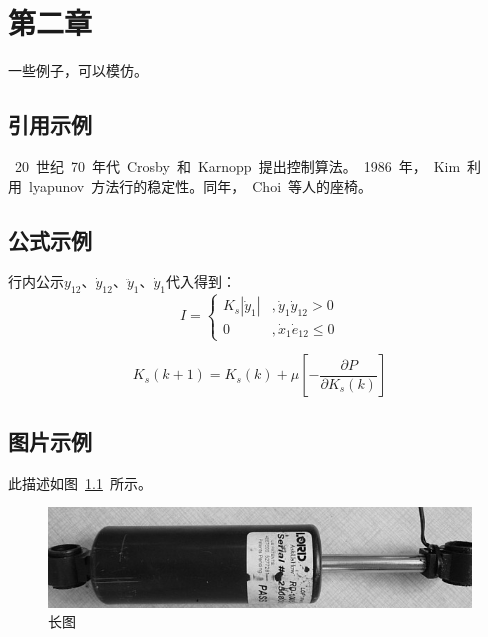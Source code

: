 \chapter{第二章} 

一些例子，可以模仿。

\section{引用示例}
~20~世纪~70~年代~Crosby~和~Karnopp~提出控制算法\cite{ck1,ck2,ck3}。~1986~年，~Kim~利用~lyapunov~方法行的稳定性\cite{ck2,ck3}。同年，~Choi~等人的座椅\cite{ck3}。

\section{公式示例} 
行内公示$y_{12}$、$\dot y_{12}$、$\ddot y_1$、$\dot y_1$代入得到：
{\setlength\abovedisplayskip{3pt}
	\setlength\belowdisplayskip{3pt}
	\begin{equation}	I = \left\{ {\begin{array}{*{20}{c}}
	{{K_s}|{{\dot y}_1}|}&{,{{\dot y}_1}{{\dot y}_{12}} > 0}\\
	0&{,{{\dot x}_1}{{\dot e}_{12}} \le 0}
	\end{array}} \right.	\end{equation}}

{\setlength\abovedisplayskip{3pt}
	\setlength\belowdisplayskip{3pt}
	\begin{equation}	{K_s}(k + 1) = {K_s}(k) + \mu \left[ { - \frac{{\partial P}}{{\partial {K_s}(k)}}} \right]	\end{equation}}


\section{图片示例}
此描述如图~\ref{fig1}~所示。

\begin{figure}[!htbp]
	\centering	\includegraphics[width=12cm]{pic/fig1}
	\caption{长图}	\label{fig1}	\end{figure}

